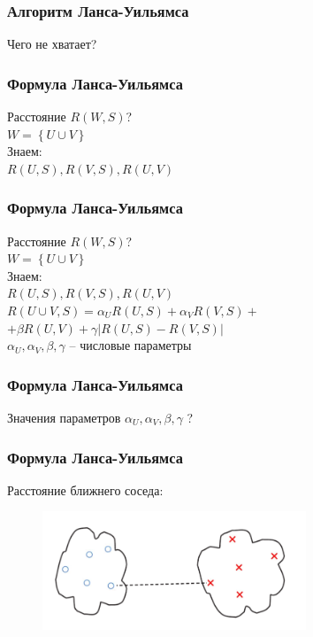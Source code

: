 \documentclass[12pt]{beamer}
\begin{document}
\begin{frame}\frametitle{Алгоритм Ланса-Уильямса}
Чего не хватает?
\end{frame}

\begin{frame}\frametitle{Формула Ланса-Уильямса}
Расстояние $R(W, S)$?\\
${ W = \left\{ U \cup V \right\} }$\\
\vspace{5mm}
Знаем:\\
${R(U, S), R(V, S), R(U, V)}$
\end{frame}

\begin{frame}\frametitle{Формула Ланса-Уильямса}
Расстояние $R(W, S)$?\\
${ W = \left\{ U \cup V \right\} }$\\
\vspace{5mm}
Знаем:\\
${R(U, S), R(V, S), R(U, V)}$\\
\vspace{5mm}
${R(U \cup V, S) = \alpha_U R(U, S) + \alpha_V R(V, S) + }$ \\
\hspace{30mm} ${ + \beta R(U, V) + \gamma \vert R(U, S) - R(V, S)\vert}$\\
\vspace{5mm}
${\alpha_U, \alpha_V, \beta, \gamma}$ -- числовые параметры
\end{frame}

\begin{frame}\frametitle{Формула Ланса-Уильямса}
Значения параметров
${\alpha_U, \alpha_V, \beta, \gamma}$ ?
\end{frame}

\begin{frame}\frametitle{Формула Ланса-Уильямса}
Расстояние ближнего соседа:\\
\begin{figure}[htbp]
  \includegraphics[height=100pt, keepaspectratio = true]{images/lans1}  
\end{figure}
\end{frame}
\end{document}
